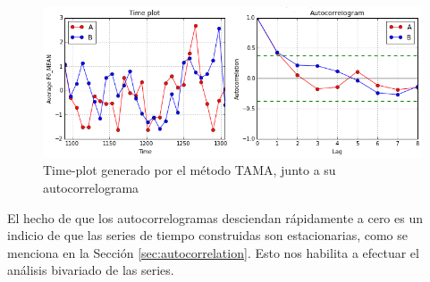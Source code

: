 \begin{figure}
\centering
\includegraphics[width=15cm]{images/time_plot_with_autocorrelation.png}
\caption{Time-plot generado por el método TAMA, junto a su autocorrelograma}
\label{fig:time_plot}
\end{figure}

El hecho de que los autocorrelogramas desciendan rápidamente a cero es un indicio de que las series de tiempo construidas son estacionarias, como se menciona en la Sección \ref{sec:autocorrelation}. Esto nos habilita a efectuar el análisis bivariado de las series.
